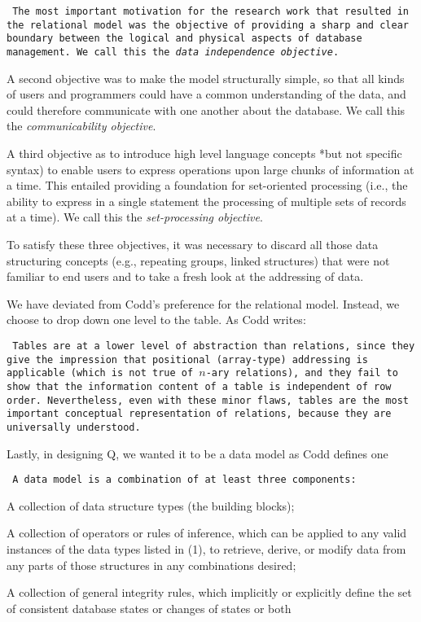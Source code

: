 {\tt 
The most important motivation for the research work that resulted in the
relational model was the objective of providing a sharp and clear
boundary between the logical and physical aspects of database
management. We call this the {\em data independence objective}.

A second objective was to make the model structurally simple, so that
all kinds of users and programmers could have a common understanding of
the data, and could therefore communicate with one another about the
database. We call this the {\em communicability objective}.

A third objective as to introduce high level language concepts *but not
specific syntax) to enable users to express operations upon large chunks
of information at a time. This entailed providing a foundation for
set-oriented processing (i.e., the ability to express in a single
statement the processing of multiple sets of records at a time). We
call this the {\em set-processing objective}.

To satisfy these three objectives, it was necessary to discard all those
data structuring concepts (e.g., repeating groups, linked structures)
that were not familiar to end users and to take a fresh look at
the addressing of data.
}

We have deviated from Codd's preference for the relational model.
Instead, we choose to drop down one level to the table. As Codd writes:

{\tt 
  Tables are at a lower level of abstraction than relations, since they
    give the impression that positional (array-type) addressing is
    applicable (which is not true of \(n\)-ary relations), and they fail
    to show that the information content of a table is independent of
    row order. Nevertheless, even with these minor flaws, tables are the
    most important conceptual representation of relations, because they
    are universally understood.

}

Lastly, in designing Q, we wanted it to be a data model as Codd defines
one

{\tt
A data model is a combination of at least three components:
  \be
  \item A collection of data structure types (the building blocks);
\item A collection of operators or rules of inference, which can be
  applied to any valid instances of the data types listed in (1), to
  retrieve, derive, or modify data from any parts of those structures in
  any combinations desired;
\item A collection of general  integrity rules, which implicitly or
  explicitly define the set of consistent database states or changes of
  states or both
  \ee

}

